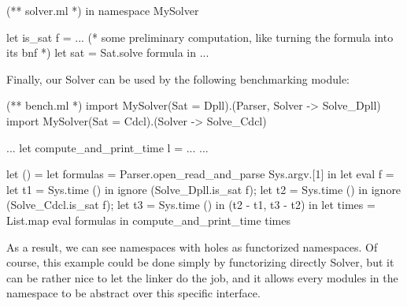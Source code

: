 \documentclass[11pt,a4paper]{article}
\begin{document}
\medskip 

\begin{OCaml}
(** solver.ml *)
in namespace MySolver

let is_sat f =
... 
(* some preliminary computation, like turning the formula into its bnf *)
  let sat = Sat.solve formula in 
...
\end{OCaml}

\medskip

Finally, our Solver can be used by the following benchmarking module:

\begin{OCaml}
(** bench.ml *)
import MySolver(Sat = Dpll).(Parser, Solver -> Solve_Dpll)
import MySolver(Sat = Cdcl).(Solver -> Solve_Cdcl)

...
let compute_and_print_time l = ...
...

let () =
  let formulas = 
    Parser.open_read_and_parse Sys.argv.[1] in
  let eval f =
    let t1 = Sys.time () in
    ignore (Solve_Dpll.is_sat f);
    let t2 = Sys.time () in
    ignore (Solve_Cdcl.is_sat f);
    let t3 = Sys.time () in
    (t2 - t1, t3 - t2)
  in
  let times = List.map eval formulas in
  compute_and_print_time times
\end{OCaml}

\medskip

As a result, we can see namespaces with holes as functorized namespaces. Of
course, this example could be done simply by functorizing directly Solver, but
it can be rather nice to let the linker do the job, and it allows every modules
in the namespace to be abstract over this specific interface.
\end{document}
